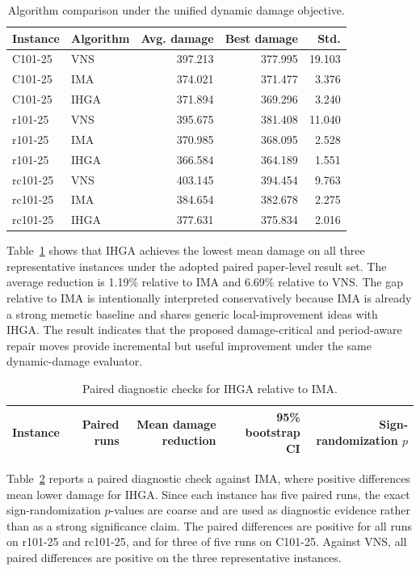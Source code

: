 ﻿\documentclass[preprint,12pt,authoryear]{elsarticle}
\begin{document}
\begin{table}[H]
\centering
\caption{Algorithm comparison under the unified dynamic damage objective.}
\label{tab:algorithm-comparison}
\small
\begin{tabular}{llrrr}
\toprule
Instance & Algorithm & Avg. damage & Best damage & Std. \\
\midrule
C101-25 & VNS  & 397.213 & 377.995 & 19.103 \\
C101-25 & IMA  & 374.021 & 371.477 & 3.376  \\
C101-25 & IHGA & 371.894 & 369.296 & 3.240  \\
\midrule
r101-25 & VNS  & 395.675 & 381.408 & 11.040 \\
r101-25 & IMA  & 370.985 & 368.095 & 2.528  \\
r101-25 & IHGA & 366.584 & 364.189 & 1.551  \\
\midrule
rc101-25 & VNS  & 403.145 & 394.454 & 9.763 \\
rc101-25 & IMA  & 384.654 & 382.678 & 2.275 \\
rc101-25 & IHGA & 377.631 & 375.834 & 2.016 \\
\bottomrule
\end{tabular}
\end{table}

Table~\ref{tab:algorithm-comparison} shows that IHGA achieves the lowest mean damage on all three representative instances under the adopted paired paper-level result set. The average reduction is 1.19\% relative to IMA and 6.69\% relative to VNS. The gap relative to IMA is intentionally interpreted conservatively because IMA is already a strong memetic baseline and shares generic local-improvement ideas with IHGA. The result indicates that the proposed damage-critical and period-aware repair moves provide incremental but useful improvement under the same dynamic-damage evaluator.

\begin{table}[H]
\centering
\caption{Paired diagnostic checks for IHGA relative to IMA.}
\label{tab:algorithm-statistical-check}
\small
\begin{tabular}{lrrrr}
\toprule
Instance & Paired runs & Mean damage reduction & 95\% bootstrap CI & Sign-randomization $p$ \\
\midrule

\end{tabular}
\end{table}

Table~\ref{tab:algorithm-statistical-check} reports a paired diagnostic check against IMA, where positive differences mean lower damage for IHGA. Since each instance has five paired runs, the exact sign-randomization $p$-values are coarse and are used as diagnostic evidence rather than as a strong significance claim. The paired differences are positive for all runs on r101-25 and rc101-25, and for three of five runs on C101-25. Against VNS, all paired differences are positive on the three representative instances.
\end{document}
